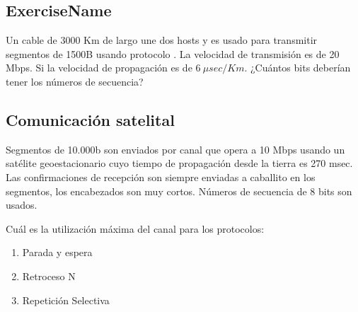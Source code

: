 \documentclass[12pt]{report}
\begin{document}
\begin{exer}
\subsection{ExerciseName \sfour}
Un cable de 3000 Km de largo une dos hosts y es usado para transmitir segmentos de
1500B usando protocolo . La velocidad de transmisión es de 20 Mbps. Si la
velocidad de propagación es de $6\ \mu sec/Km$. ¿Cuántos bits deberían tener los números de secuencia?
\end{exer}

\begin{exer}
\subsection{Comunicación satelital \sthree}
Segmentos de 10.000b son enviados por canal que opera a 10 Mbps usando un
satélite geoestacionario cuyo tiempo de propagación desde la tierra es 270 msec. Las
confirmaciones de recepción son siempre enviadas a caballito en los segmentos, los encabezados
son muy cortos.
Números de secuencia de 8 bits son usados. 

Cuál es la utilización máxima del canal para los protocolos:
\begin{enumerate}
\item Parada y espera
\item Retroceso N
\item Repetición Selectiva
\end{enumerate}
\end{exer}
\end{document}
